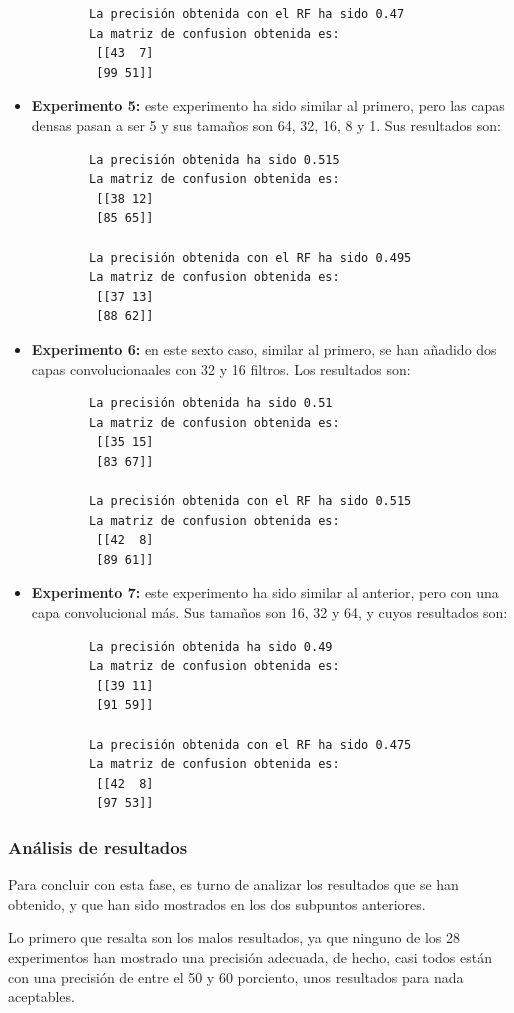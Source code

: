 \begin{itemize}
\begin{verbatim}
        La precisión obtenida con el RF ha sido 0.47
        La matriz de confusion obtenida es:
         [[43  7]
         [99 51]]
    \end{verbatim}
    \item \textbf{Experimento 5:} este experimento ha sido similar al primero, pero las capas densas pasan a ser 5 y sus tamaños son 64, 32, 16, 8 y 1. Sus resultados son:
    \begin{verbatim}
        La precisión obtenida ha sido 0.515
        La matriz de confusion obtenida es:
         [[38 12]
         [85 65]]
        
        La precisión obtenida con el RF ha sido 0.495
        La matriz de confusion obtenida es:
         [[37 13]
         [88 62]]
    \end{verbatim}
    \item \textbf{Experimento 6:} en este sexto caso, similar al primero, se han añadido dos capas convolucionaales con 32 y 16 filtros. Los resultados son:
    \begin{verbatim}
        La precisión obtenida ha sido 0.51
        La matriz de confusion obtenida es:
         [[35 15]
         [83 67]]
        
        La precisión obtenida con el RF ha sido 0.515
        La matriz de confusion obtenida es:
         [[42  8]
         [89 61]]
    \end{verbatim}
    \item \textbf{Experimento 7:} este experimento ha sido similar al anterior, pero con una capa convolucional más. Sus tamaños son 16, 32 y 64, y cuyos resultados son:
    \begin{verbatim}
        La precisión obtenida ha sido 0.49
        La matriz de confusion obtenida es:
         [[39 11]
         [91 59]]
        
        La precisión obtenida con el RF ha sido 0.475
        La matriz de confusion obtenida es:
         [[42  8]
         [97 53]]
    \end{verbatim}
\end{itemize}

\subsubsection{Análisis de resultados}
Para concluir con esta fase, es turno de analizar los resultados que se han obtenido, y que han sido mostrados en los dos subpuntos anteriores.

Lo primero que resalta son los malos resultados, ya que ninguno de los 28 experimentos han mostrado una precisión adecuada, de hecho, casi todos están con una precisión de entre el 50 y 60 porciento, unos resultados para nada aceptables.

